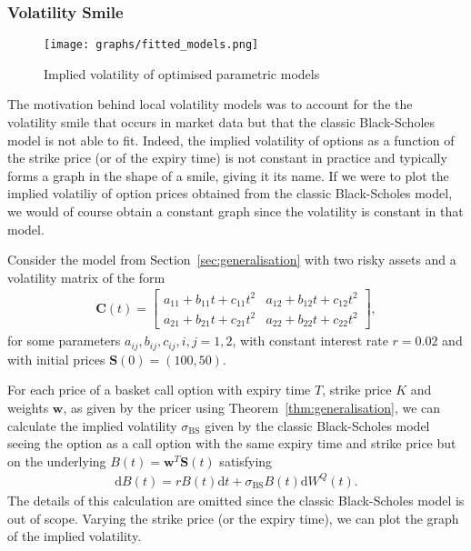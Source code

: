 \documentclass[english]{article}
\numberwithin{equation}{section}
\numberwithin{figure}{section}
\theoremstyle{bolddescit}
\theoremstyle{definition}
\theoremstyle{definition}
\theoremstyle{plain}
\theoremstyle{plain}
\theoremstyle{bolddesc}
\theoremstyle{plain}
\theoremstyle{remark}
\begin{document}
\subsubsection{Volatility Smile}

\begin{figure}
  \caption{Implied volatility of optimised parametric models}
  \texttt{[image: graphs/fitted\_models.png]}
  \label{fig:fitted-models}
\end{figure}

The motivation behind local volatility models was to account for the the volatility smile that occurs in market data but that the classic Black-Scholes model is not able to fit. Indeed, the implied volatility of options as a function of the strike price (or of the expiry time) is not constant in practice and typically forms a graph in the shape of a smile, giving it its name. If we were to plot the implied volatiliy of option prices obtained from the classic Black-Scholes model, we would of course obtain a constant graph since the volatility is constant in that model.

Consider the model from Section~\ref{sec:generalisation} with two risky assets and a volatility matrix of the form
\begin{align*}
  \mathbf{C}(t) = \begin{bmatrix}
    a_{11} + b_{11} t + c_{11} t^2 & a_{12} + b_{12} t + c_{12} t^2\\
    a_{21} + b_{21} t + c_{21} t^2 & a_{22} + b_{22} t + c_{22} t^2
  \end{bmatrix},
\end{align*}
for some parameters $a_{ij}, b_{ij}, c_{ij}, i,j=1,2$, with constant interest rate $r = 0.02$ and with initial prices $\mathbf{S}(0) = (100, 50)$.

For each price of a basket call option with expiry time $T$, strike price $K$ and weights $\mathbf{w}$, as given by the pricer using Theorem~\ref{thm:generalisation}, we can calculate the implied volatility $\sigma_\text{BS}$ given by the classic Black-Scholes model seeing the option as a call option with the same expiry time and strike price but on the underlying $B(t) = \mathbf{w}^T \mathbf{S}(t)$ satisfying
\begin{align*}
  \mathrm{d}B(t) = r B(t) \mathrm{d}t + \sigma_\text{BS} B(t) \mathrm{d}W^Q(t).
\end{align*}
The details of this calculation are omitted since the classic Black-Scholes model is out of scope. Varying the strike price (or the expiry time), we can plot the graph of the implied volatility.
\end{document}
